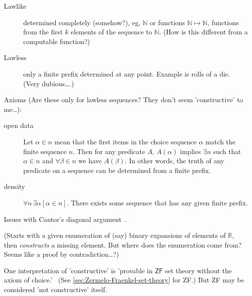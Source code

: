 \label{sec:Choice_sequences}

\begin{description}
\item[Lawlike] determined completely (somehow?),
eg, $\mathbb{N}$ or functions $\mathbb{N} \mapsto \mathbb{N}$,
functions from the first $k$ elements of the sequence to 
$\mathbb{N}$.
(How is this different from a computable function?)
\item[Lawless] only a finite prefix determined at any point.
Example is rolls of a die. (Very dubious\ldots.)
\end{description}

Axioms 
(Are these only for lawless sequences?
They don't seem 'constructive' to me\ldots):
\begin{description}
\item[open data] Let $\alpha \in n$ mean that the first items
in the choice sequence $\alpha$ match the finite sequence $n$.
Then for any predicate $A$,
$A(\alpha )$ implies  $\exists n$ such that
$\alpha \in n$ and $\forall \beta \in n$ we have $A(\beta )$.
In other words, the truth of any predicate on a sequence can be
determined from a finite prefix.
\item[density] $\forall n\,\exists \alpha [\alpha \in n]$.
There exists some sequence that has any given finite prefix.
\end{description}


\label{sec:Computable_function}
\cite{wiki:Computable_function}

\label{sec:Cardinality_of_R}

Issues with Cantor's diagonal 
argument~\cite{wiki:Cantors_diagonal_argument}.

(Starts with a given enumeration of (say) binary expansions of 
elements of $\mathbb{R}$, then \textit{constructs} a missing
element. But where does the enumeration come from?
Seems like a proof by contradiction\ldots?)

\label{sec:Axiom_of_choice}

One interpretation of 'constructive' is
'provable in $\textsf{ZF}$ set theory without the axiom of 
choice.'~\cite{iep:Set_theory,wiki:Axiom_of_choice}
(See \autoref{sec:Zermelo-Fraenkel-set-theory} for \textsf{ZF}.)
But \textsf{ZF} may be considered 'not constructive'
itself.

